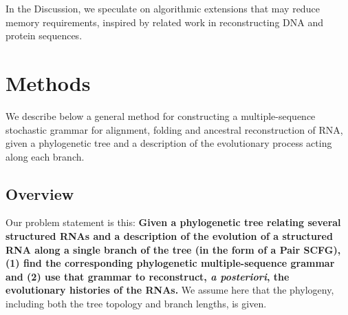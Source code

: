 \documentclass[10pt]{article}
\begin{document}
In the Discussion, we speculate on algorithmic extensions that
may reduce memory requirements, inspired by related work in
reconstructing DNA and protein sequences.



\newpage
\section*{Methods}
We describe below a general method for constructing a multiple-sequence
stochastic grammar for alignment, folding and ancestral reconstruction of RNA,
given a phylogenetic tree and a description of the evolutionary
process acting along each branch.

% 


\subsection*{Overview}

Our problem statement is this:
\textbf{Given a phylogenetic tree relating several structured RNAs and a
  description of the evolution of a structured RNA
  along a single branch of the tree (in the form of a Pair SCFG),
  (1) find the corresponding
  phylogenetic multiple-sequence grammar and (2) use that grammar to
  reconstruct, {\em a posteriori}, the evolutionary histories of the
  RNAs.}
We assume here that the phylogeny, including both the tree topology
and branch lengths, is given.
\end{document}
